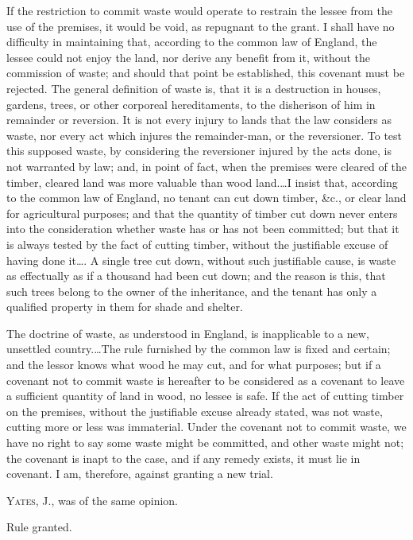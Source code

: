If the restriction to commit waste would operate to restrain the lessee from the
use of the premises, it would be void, as repugnant to the grant. I shall have
no difficulty in maintaining that, according to the common law of England, the
lessee could not enjoy the land, nor derive any benefit from it, without the
commission of waste; and should that point be established, this covenant must
be rejected. The general definition of waste is, that it is a destruction in
houses, gardens, trees, or other corporeal hereditaments, to the disherison of
him in remainder or reversion. It is not every injury to lands that the law
considers as waste, nor every act which injures the remainder-man, or the
reversioner. To test this supposed waste, by considering the reversioner
injured by the acts done, is not warranted by law; and, in point of fact, when
the premises were cleared of the timber, cleared land was more valuable than
wood land.\dots I insist that, according to the common law of England, no
tenant can cut down timber, \&c., or clear land for agricultural purposes; and
that the quantity of timber cut down never enters into the consideration
whether waste has or has not been committed; but that it is always tested by
the fact of cutting timber, without the justifiable excuse of having done
it\dots. A single tree cut down, without such justifiable cause, is waste as
effectually as if a thousand had been cut down; and the reason is this, that
such trees belong to the owner of the inheritance, and the tenant has only a
qualified property in them for shade and shelter.

The doctrine of waste, as understood in England, is inapplicable to a new,
unsettled country.\dots The rule furnished by the common law is fixed and
certain; and the lessor knows what wood he may cut, and for what purposes; but
if a covenant not to commit waste is hereafter to be considered as a covenant
to leave a sufficient quantity of land in wood, no lessee is safe. If the act
of cutting timber on the premises, without the justifiable excuse already
stated, was not waste, cutting more or less was immaterial. Under the covenant
not to commit waste, we have no right to say some waste might be committed, and
other waste might not; the covenant is inapt to the case, and if any remedy
exists, it must lie in covenant. I am, therefore, against granting a new trial.

\opinion \textsc{Yates}, J., was of the same opinion.

Rule granted.

